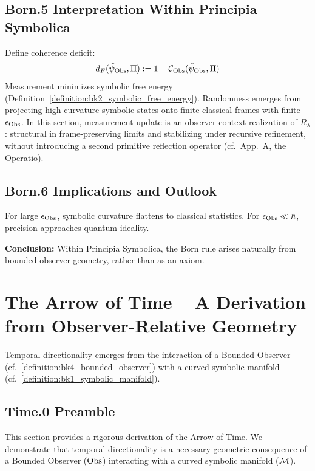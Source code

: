 \subsection{Born.5 Interpretation Within Principia Symbolica}
\label{subsec:appC_born_interpretation_ps}
Define coherence deficit:
\[
d_F(\tilde\psi_{\mathrm{Obs}}, \Pi) := 1 - \mathcal{C}_{\mathrm{Obs}}(\tilde\psi_{\mathrm{Obs}}, \Pi)
\]
Measurement minimizes symbolic free energy (Definition~\ref{definition:bk2_symbolic_free_energy}).
Randomness emerges from projecting high-curvature symbolic states
onto finite classical frames with finite $\epsilon_{\mathrm{Obs}}$.
In this section, measurement update is an observer-context realization of \(R_\lambda\): structural in frame-preserving limits and stabilizing under recursive refinement, without introducing a second primitive reflection operator (cf.~\hyperref[dict:appA_symbolic_reflection_operator]{App.~A}, the \hyperref[sec:bk1_operatio]{Operatio}).

\subsection{Born.6 Implications and Outlook}
\label{subsec:appC_born_outlook}
For large $\epsilon_{\mathrm{Obs}}$, symbolic curvature flattens to classical statistics.
For $\epsilon_{\mathrm{Obs}} \ll \hbar$, precision approaches quantum ideality.

\medskip

\noindent
\textbf{Conclusion:} Within Principia Symbolica, the Born rule arises naturally
from bounded observer geometry, rather than as an axiom.

\section[The Arrow of Time]{The Arrow of Time – A Derivation from Observer-Relative Geometry}
\label{sec:appC_arrow_of_time_rigorous}
Temporal directionality emerges from the interaction of a Bounded Observer (cf.~\ref{definition:bk4_bounded_observer}) with a curved symbolic manifold (cf.~\ref{definition:bk1_symbolic_manifold}).

\subsection*{Time.0 Preamble}
\label{subsec:appC_time_preamble_rigorous}
This section provides a rigorous derivation of the Arrow of Time. We demonstrate that temporal directionality is a necessary geometric consequence of a Bounded Observer (\(\mathrm{Obs}\)) interacting with a curved symbolic manifold (\(\mathcal{M}\)).

